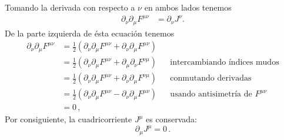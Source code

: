 \begin{frame}
Tomando la derivada con respecto a $\nu$ en ambos lados tenemos
\begin{align}
   \partial_\nu\partial_\mu F^{\mu\nu}&=\partial_\nu J^\nu.
\end{align}
De la parte izquierda de ésta ecuación tenemos
\begin{align*}
  \partial_\nu\partial_\mu F^{\mu\nu}&=\tfrac{1}{2}\left(\partial_\nu\partial_\mu F^{\mu\nu}+\partial_\nu\partial_\mu F^{\mu\nu}  \right)\nonumber\\
&=\tfrac{1}{2}\left(\partial_\nu\partial_\mu F^{\mu\nu}+\partial_\mu\partial_\nu F^{\nu\mu}  \right)
&&\text{intercambiando índices mudos}\nonumber\\
&=\tfrac{1}{2}\left(\partial_\nu\partial_\mu F^{\mu\nu}+\partial_\nu\partial_\mu F^{\nu\mu}  \right)
&&\text{conmutando derivadas}\nonumber\\
&=\tfrac{1}{2}\left(\partial_\nu\partial_\mu F^{\mu\nu}-\partial_\nu\partial_\mu F^{\mu\nu}  \right)
&&\text{usando antisimetría de $F^{\mu\nu}$}\nonumber\\
&=0\,,
\end{align*}
Por consiguiente, la cuadricorriente $J^\mu$ es conservada:
\begin{equation}
  \label{eq:consvjmu}
  \partial_\mu J^\mu=0\,.
\end{equation}



\end{frame}
